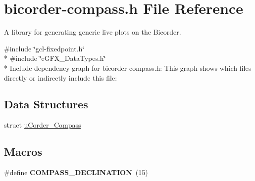 \hypertarget{bicorder-compass_8h}{}\section{bicorder-\/compass.h File Reference}
\label{bicorder-compass_8h}


A library for generating generic live plots on the Bicorder.  


{\ttfamily \#include \char`\"{}gcl-\/fixedpoint.\+h\char`\"{}}\\*
{\ttfamily \#include \char`\"{}e\+G\+F\+X\+\_\+\+Data\+Types.\+h\char`\"{}}\\*
Include dependency graph for bicorder-\/compass.h\+:
This graph shows which files directly or indirectly include this file\+:
\subsection*{Data Structures}
\begin{DoxyCompactItemize}
\item 
struct \hyperlink{structuCorder__Compass}{u\+Corder\+\_\+\+Compass}
\end{DoxyCompactItemize}
\subsection*{Macros}
\begin{DoxyCompactItemize}
\item 
\#define {\bfseries C\+O\+M\+P\+A\+S\+S\+\_\+\+D\+E\+C\+L\+I\+N\+A\+T\+I\+ON}~(15)\hypertarget{bicorder-compass_8h_ae36b72028ffc628f320aba81b702036d}{}\label{bicorder-compass_8h_ae36b72028ffc628f320aba81b702036d}

\end{DoxyCompactItemize}
